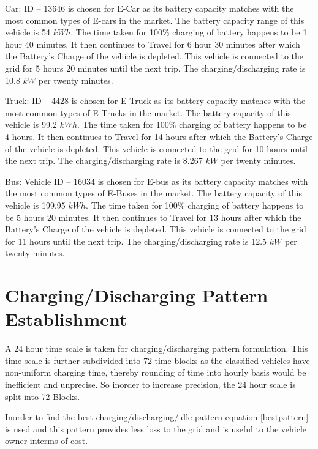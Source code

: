 	Car: ID – 13646 \cite{evdata} is chosen for E-Car as its battery capacity matches with the most common types of E-cars in the market. The
	battery capacity range of this vehicle is 54 $kWh$. The time taken for 100\% charging of battery
	happens to be 1 hour 40 minutes. It then continues to Travel for 6 hour 30 minutes after which the Battery's Charge of the vehicle is depleted. This vehicle is connected to the grid for 5 hours 20 minutes until the next trip. The charging/discharging rate is 10.8 $kW$ per twenty minutes.
	
	Truck: ID – 4428 \cite{evdata} is chosen for E-Truck as its battery capacity matches with the most common types of E-Trucks in the market. The
	battery capacity of this vehicle is 99.2 $kWh$. The time taken for 100\% charging of battery
	happens to be 4 hours. It then continues to Travel for 14 hours after which the Battery's Charge of the vehicle is depleted. This vehicle is connected to the grid for 10 hours until the next trip. The charging/discharging rate is 8.267 $kW$ per twenty minutes.
	
	Bus: Vehicle ID – 16034 \cite{evdata} is chosen for E-bus as its battery capacity matches with the most common types of E-Buses in the market. The
	battery capacity of this vehicle is 199.95 $kWh$. The time taken for 100\% charging of battery
	happens to be 5 hours 20 minutes. It then continues to Travel for 13 hours after which the Battery's Charge of the vehicle is depleted. This vehicle is connected to the grid for 11 hours until the next trip. The charging/discharging rate is 12.5 $kW$ per twenty minutes.
	



	\section{Charging/Discharging Pattern Establishment}
	
	A 24 hour time scale is taken for charging/discharging pattern formulation. This time scale is further subdivided into 72 time blocks as the classified vehicles have non-uniform charging time, thereby rounding of time into hourly basis would be inefficient and unprecise. So inorder to increase precision, the 24 hour scale is split into 72 Blocks.
	
	\noindent Inorder to find the best charging/discharging/idle pattern equation \eqref{bestpattern} is used and this pattern provides less loss to the grid and is useful to the vehicle owner interms of cost.
	

